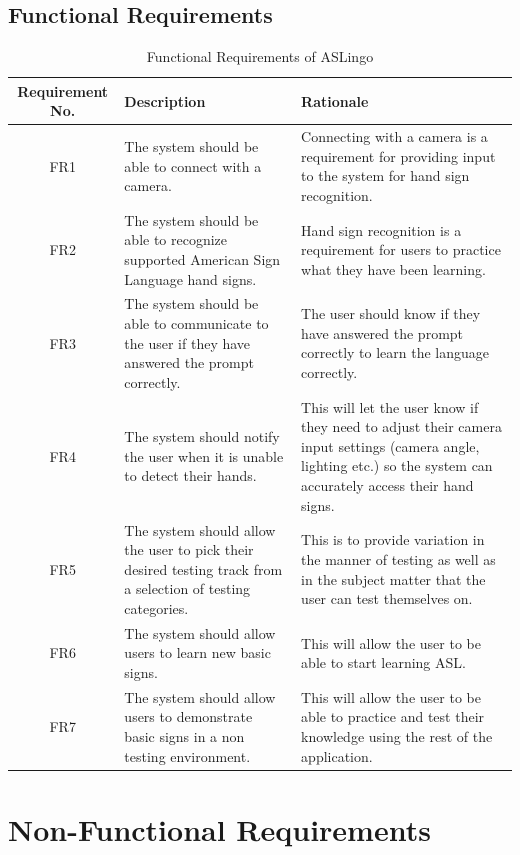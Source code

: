 \documentclass[12pt, titlepage]{article}
\begin{document}
\newpage

\subsection{Functional Requirements}

\begin{longtable}{| c | p{4cm}| p{6cm}|}
    \caption{Functional Requirements of ASLingo} \\
    \hline
    \textbf{Requirement No.} & \textbf{Description} &\textbf{Rationale}\\
    \hline
    FR1 & The system should be able to connect with a camera. & Connecting with a camera is a requirement for providing input to the system for hand sign recognition. \\
    \hline
    FR2 & The system should be able to recognize supported American Sign Language hand signs. & Hand sign recognition is a requirement for users to practice what they have been learning. \\
    \hline
    FR3 & The system should be able to communicate to the user if they have answered the prompt correctly. & The user should know if they have answered the prompt correctly to learn the language correctly. \\ 
    \hline
    FR4 & The system should notify the user when it is unable to detect their hands. & This will let the user know if they need to adjust their camera input settings (camera angle, lighting etc.) so the system can accurately access their hand signs. \\
    \hline
    FR5 & The system should allow the user to pick their desired testing track from a selection of testing categories. & This is to provide variation in the manner of testing as well as in the subject matter that the user can test themselves on. \\
    \hline
    FR6 & The system should allow users to learn new basic signs. & This will allow the user to be able to start learning ASL. \\
    \hline
    FR7 & The system should allow users to demonstrate basic signs in a non testing environment. & This will allow the user to be able to practice and test their knowledge using the rest of the application. \\
    \bottomrule
\end{longtable}

\section{Non-Functional Requirements}
\end{document}
